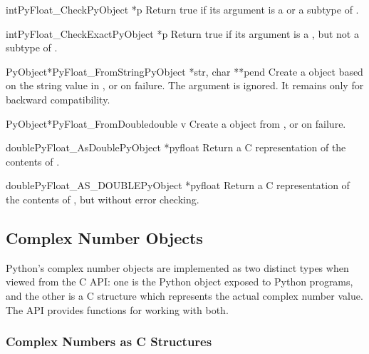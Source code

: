 \begin{cfuncdesc}{int}{PyFloat_Check}{PyObject *p}
  Return true if its argument is a  or a subtype
  of .
\end{cfuncdesc}

\begin{cfuncdesc}{int}{PyFloat_CheckExact}{PyObject *p}
  Return true if its argument is a , but not a
  subtype of .
\end{cfuncdesc}

\begin{cfuncdesc}{PyObject*}{PyFloat_FromString}{PyObject *str, char **pend}
  Create a  object based on the string value in
  , or \NULL{} on failure.  The  argument is ignored.  It
  remains only for backward compatibility.
\end{cfuncdesc}

\begin{cfuncdesc}{PyObject*}{PyFloat_FromDouble}{double v}
  Create a  object from , or \NULL{} on
  failure.
\end{cfuncdesc}

\begin{cfuncdesc}{double}{PyFloat_AsDouble}{PyObject *pyfloat}
  Return a C  representation of the contents of
  .
\end{cfuncdesc}

\begin{cfuncdesc}{double}{PyFloat_AS_DOUBLE}{PyObject *pyfloat}
  Return a C  representation of the contents of
  , but without error checking.
\end{cfuncdesc}


\subsection{Complex Number Objects \label{complexObjects}}

Python's complex number objects are implemented as two distinct types
when viewed from the C API:  one is the Python object exposed to
Python programs, and the other is a C structure which represents the
actual complex number value.  The API provides functions for working
with both.

\subsubsection{Complex Numbers as C Structures}


